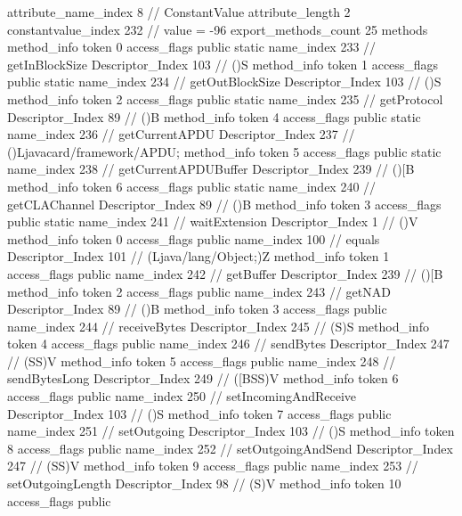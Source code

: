 {{{{{{{					attribute_name_index	8		// ConstantValue
					attribute_length	2
					constantvalue_index	232		// value = -96
				}
				}
			}
			}
			export_methods_count	25
			methods {
				method_info {
					token	0
					access_flags	public static
					name_index	233		// getInBlockSize
					Descriptor_Index	103		// ()S
				}
				method_info {
					token	1
					access_flags	public static
					name_index	234		// getOutBlockSize
					Descriptor_Index	103		// ()S
				}
				method_info {
					token	2
					access_flags	public static
					name_index	235		// getProtocol
					Descriptor_Index	89		// ()B
				}
				method_info {
					token	4
					access_flags	public static
					name_index	236		// getCurrentAPDU
					Descriptor_Index	237		// ()Ljavacard/framework/APDU;
				}
				method_info {
					token	5
					access_flags	public static
					name_index	238		// getCurrentAPDUBuffer
					Descriptor_Index	239		// ()[B
				}
				method_info {
					token	6
					access_flags	public static
					name_index	240		// getCLAChannel
					Descriptor_Index	89		// ()B
				}
				method_info {
					token	3
					access_flags	public static
					name_index	241		// waitExtension
					Descriptor_Index	1		// ()V
				}
				method_info {
					token	0
					access_flags	public
					name_index	100		// equals
					Descriptor_Index	101		// (Ljava/lang/Object;)Z
				}
				method_info {
					token	1
					access_flags	public
					name_index	242		// getBuffer
					Descriptor_Index	239		// ()[B
				}
				method_info {
					token	2
					access_flags	public
					name_index	243		// getNAD
					Descriptor_Index	89		// ()B
				}
				method_info {
					token	3
					access_flags	public
					name_index	244		// receiveBytes
					Descriptor_Index	245		// (S)S
				}
				method_info {
					token	4
					access_flags	public
					name_index	246		// sendBytes
					Descriptor_Index	247		// (SS)V
				}
				method_info {
					token	5
					access_flags	public
					name_index	248		// sendBytesLong
					Descriptor_Index	249		// ([BSS)V
				}
				method_info {
					token	6
					access_flags	public
					name_index	250		// setIncomingAndReceive
					Descriptor_Index	103		// ()S
				}
				method_info {
					token	7
					access_flags	public
					name_index	251		// setOutgoing
					Descriptor_Index	103		// ()S
				}
				method_info {
					token	8
					access_flags	public
					name_index	252		// setOutgoingAndSend
					Descriptor_Index	247		// (SS)V
				}
				method_info {
					token	9
					access_flags	public
					name_index	253		// setOutgoingLength
					Descriptor_Index	98		// (S)V
				}
				method_info {
					token	10
					access_flags	public
}}}}}
